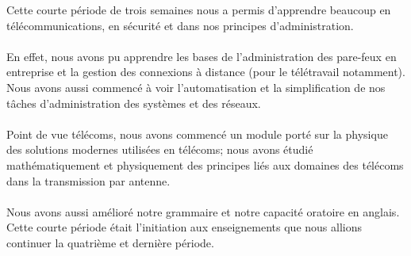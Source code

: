 \begin{resumo}
    Cette courte période de trois semaines nous a permis d'apprendre beaucoup en télécommunications, en sécurité et dans nos principes d'administration.
    \\ \\
    En effet, nous avons pu apprendre les bases de l'administration des pare-feux en entreprise et la gestion des connexions à distance (pour le télétravail notamment). Nous avons aussi commencé à voir l'automatisation et la simplification de nos tâches d'administration des systèmes et des réseaux.
    \\ \\
    Point de vue télécoms, nous avons commencé un module porté sur la physique des solutions modernes utilisées en télécoms; nous avons étudié mathématiquement et physiquement des principes liés aux domaines des télécoms dans la transmission par antenne.
    \\ \\
    Nous avons aussi amélioré notre grammaire et notre capacité oratoire en anglais. Cette courte période était l'initiation aux enseignements que nous allions continuer la quatrième et dernière période.
    
\end{resumo}